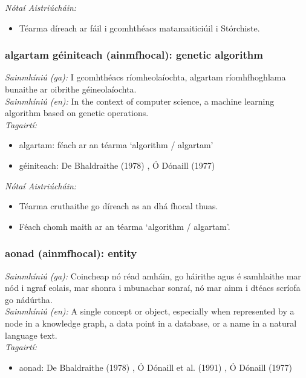  \noindent \textit{Nótaí Aistriúcháin:}
\begin{itemize}
	\item Téarma díreach ar fáil i gcomhthéacs matamaiticiúil i Stórchiste.
\end{itemize}


\subsubsection*{algartam géiniteach (ainmfhocal): genetic algorithm}
 \noindent \textit{Sainmhíniú (ga):} I gcomhthéacs ríomheolaíochta, algartam ríomhfhoghlama bunaithe ar oibrithe géineolaíochta.
\\
 \noindent \textit{Sainmhíniú (en):} In the context of computer science, a machine learning algorithm based on genetic operations.
\\
 \noindent \textit{Tagairtí:}
\begin{itemize}
	\item algartam: féach ar an téarma `algorithm / algartam'
	\item géiniteach: De Bhaldraithe (1978) \cite{de-bhaldraithe}, Ó Dónaill (1977) \cite{odonaill}
\end{itemize}

 \noindent \textit{Nótaí Aistriúcháin:}
\begin{itemize}
	\item Téarma cruthaithe go díreach as an dhá fhocal thuas.
	\item Féach chomh maith ar an téarma `algorithm / algartam'.
\end{itemize}


\subsubsection*{aonad (ainmfhocal): entity}
 \noindent \textit{Sainmhíniú (ga):} Coincheap nó réad amháin, go háirithe agus é samhlaithe mar nód i ngraf eolais, mar shonra i mbunachar sonraí, nó mar ainm i dtéacs scríofa go nádúrtha.
\\
 \noindent \textit{Sainmhíniú (en):} A single concept or object, especially when represented by a node in a knowledge graph, a data point in a database, or a name in a natural language text.
\\
 \noindent \textit{Tagairtí:}
\begin{itemize}
	\item aonad: De Bhaldraithe (1978) \cite{de-bhaldraithe}, Ó Dónaill et al. (1991) \cite{focloir-beag}, Ó Dónaill (1977) \cite{odonaill}
\end{itemize}

